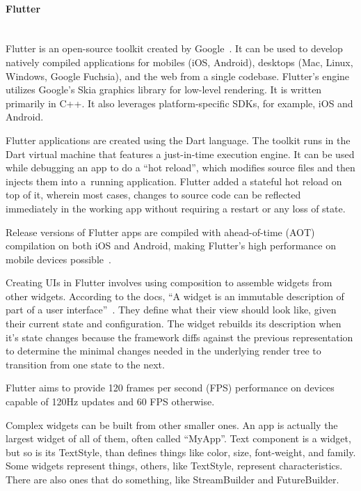 \paragraph{\large{Flutter}}\mbox{}\\[2pt]
Flutter is an open-source toolkit created by Google~\cite{flutter}. It can be used to develop natively compiled applications for mobiles (iOS, Android), desktops (Mac, Linux, Windows, Google Fuchsia), and the web from a single codebase. Flutter's engine utilizes Google's Skia graphics library for low-level rendering. It is written primarily in C++. It also leverages platform-specific SDKs, for example, iOS and Android.

Flutter applications are created using the Dart language. The toolkit runs in the Dart virtual machine that features a just-in-time execution engine. It can be used while debugging an app to do a ``hot reload'', which modifies source files and then injects them into a~running application. Flutter added a stateful hot reload on top of it, wherein most cases, changes to source code can be reflected immediately in the working app without requiring a restart or any loss of state.

Release versions of Flutter apps are compiled with ahead-of-time (AOT) compilation on both iOS and Android, making Flutter's high performance on mobile devices possible~\cite{flutter-wiki}.

Creating UIs in Flutter involves using composition to assemble widgets from other widgets. According to the docs, ``A widget is an immutable description of part of a user interface''~\cite{flutter}. They define what their view should look like, given their current state and configuration. The widget rebuilds its description when it's state changes because the framework diffs against the previous representation to determine the minimal changes needed in the underlying render tree to transition from one state to the next.

Flutter aims to provide 120 frames per second (FPS) performance on devices capable of 120Hz updates and 60 FPS otherwise.

Complex widgets can be built from other smaller ones. An app is actually the largest widget of all of them, often called ``MyApp''. Text component is a widget, but so is its TextStyle, than defines things like color, size, font-weight, and family. Some widgets represent things, others, like TextStyle, represent characteristics. There are also ones that do something, like StreamBuilder and FutureBuilder.

